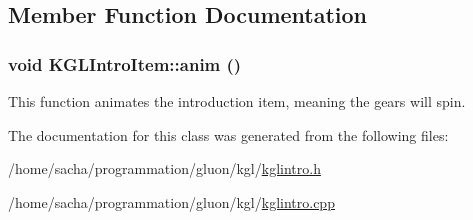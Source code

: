 \subsection{Member Function Documentation}
\hypertarget{class_k_g_l_intro_item_123f0b6f3fd34ed385a34b6485db7c2e}{
\subsubsection[{anim}]{\setlength{\rightskip}{0pt plus 5cm}void KGLIntroItem::anim ()}}
\label{class_k_g_l_intro_item_123f0b6f3fd34ed385a34b6485db7c2e}


This function animates the introduction item, meaning the gears will spin. 

The documentation for this class was generated from the following files:\begin{CompactItemize}
\item 
/home/sacha/programmation/gluon/kgl/\hyperlink{kglintro_8h}{kglintro.h}\item 
/home/sacha/programmation/gluon/kgl/\hyperlink{kglintro_8cpp}{kglintro.cpp}\end{CompactItemize}
